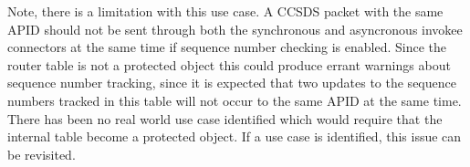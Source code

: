 Note, there is a limitation with this use case. A CCSDS packet with the same APID should not be sent through both the synchronous and asyncronous invokee connectors at the same time if sequence number checking is enabled. Since the router table is not a protected object this could produce errant warnings about sequence number tracking, since it is expected that two updates to the sequence numbers tracked in this table will not occur to the same APID at the same time. There has been no real world use case identified which would require that the internal table become a protected object. If a use case is identified, this issue can be revisited.
